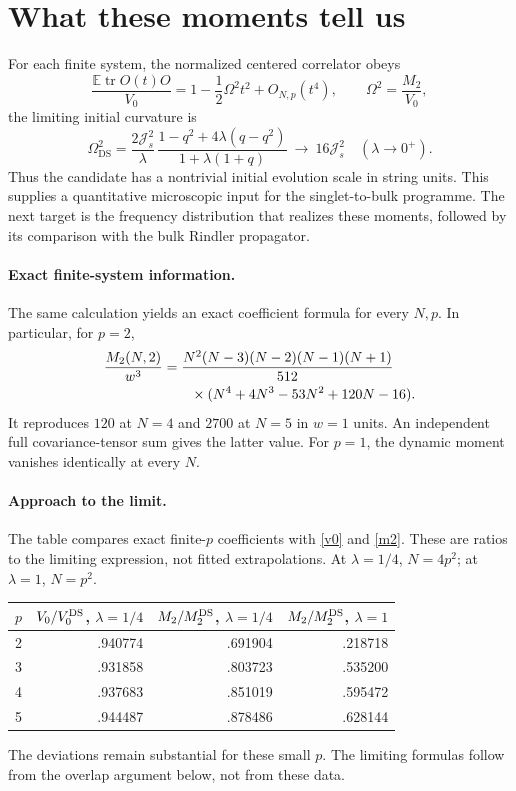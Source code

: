 \documentclass[11pt,a4paper]{article}
\newcommand{\tr}{\operatorname{tr}}
\newcommand{\E}{\mathbb E}
\newcommand{\Js}{\mathcal J_s}
\begin{document}
\newpage
\section{What these moments tell us}
For each finite system, the normalized centered correlator obeys
\begin{equation}
 \frac{\E\tr O(t)O}{V_0}=1-\frac12\Omega^2 t^2+O_{N,p}(t^4),
 \qquad \Omega^2=\frac{M_2}{V_0},
\end{equation}
the limiting initial curvature is
\begin{equation}
 \Omega^2_{\mathrm{DS}}=
 \frac{2\Js^2}{\lambda}\,
 \frac{1-q^2+4\lambda(q-q^2)}{1+\lambda(1+q)}
 \ \longrightarrow\ 16\Js^2\quad(\lambda\to0^+).\label{curvature}
\end{equation}
Thus the candidate has a nontrivial initial evolution scale in string
units. This supplies a quantitative microscopic input for the
singlet-to-bulk programme. The next target is the frequency distribution
that realizes these moments, followed by its comparison with the bulk
Rindler propagator.

\paragraph{Exact finite-system information.}
The same calculation yields an exact coefficient formula for every
$N,p$. In particular, for $p=2$,
\begin{align}
 \frac{M_2(N,2)}{w^3}
 &=\frac{N^2(N-3)(N-2)(N-1)(N+1)}{512}\notag\\
 &\hspace{7mm}\times
   (N^4+4N^3-53N^2+120N-16).\label{p2}
\end{align}
It reproduces $120$ at $N=4$ and $2700$ at $N=5$ in $w=1$ units.
An independent full covariance-tensor sum gives the latter value.
For $p=1$, the dynamic moment vanishes identically at every $N$.

\paragraph{Approach to the limit.}
The table compares exact finite-$p$ coefficients with \eqref{v0} and
\eqref{m2}. These are ratios to the limiting expression, not fitted
extrapolations. At $\lambda=1/4$, $N=4p^2$; at $\lambda=1$, $N=p^2$.
\begin{center}
\begin{tabular}{rrrr}\toprule
$p$ & $V_0/V_0^{\rm DS}$, $\lambda=1/4$
    & $M_2/M_2^{\rm DS}$, $\lambda=1/4$
    & $M_2/M_2^{\rm DS}$, $\lambda=1$\\\midrule
2 & .940774 & .691904 & .218718\\
3 & .931858 & .803723 & .535200\\
4 & .937683 & .851019 & .595472\\
5 & .944487 & .878486 & .628144\\\bottomrule
\end{tabular}
\end{center}
The deviations remain substantial for these small $p$. The limiting
formulas follow from the overlap argument below, not from these data.
\end{document}
